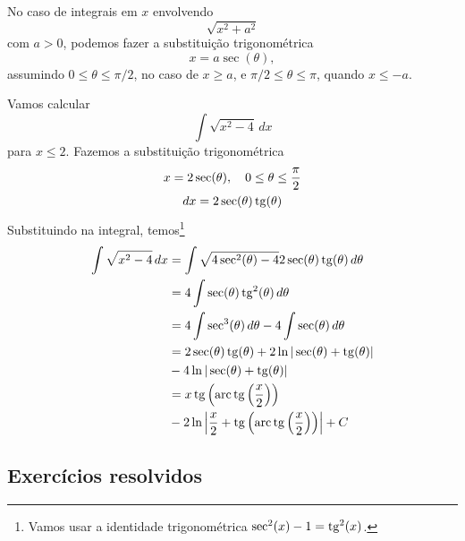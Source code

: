 No caso de integrais em $x$ envolvendo
\begin{equation}
  \sqrt{x^2+a^2}
\end{equation}
com $a>0$, podemos fazer a substituição trigonométrica
\begin{equation}
  x = a\sec(\theta),
\end{equation}
assumindo $0\leq\theta\leq\pi/2$, no caso de $x\geq a$, e $\pi/2\leq\theta\leq\pi$, quando $x\leq -a$.

\begin{ex}
  Vamos calcular
  \begin{equation}
    \int\sqrt{x^2-4}\,dx
  \end{equation}
  para $x\leq 2$. Fazemos a substituição trigonométrica
  \begin{gather}
    x = 2\sec(\theta),\quad 0\leq\theta\leq\frac{\pi}{2}\\
    dx = 2\sec(\theta)\operatorname{tg}(\theta)
  \end{gather}
  Substituindo na integral, temos\footnote{Vamos usar a identidade trigonométrica $\sec^2(x)-1=\operatorname{tg}^2(x)$.}
  \begin{align}
    \int\sqrt{x^2-4}\,dx &= \int\sqrt{4\sec^2(\theta)-4}2\sec(\theta)\operatorname{tg}(\theta)\,d\theta\\
                         &= 4\int\sec(\theta)\operatorname{tg}^2(\theta)\,d\theta\\
                         &= 4\int\sec^3(\theta)\,d\theta - 4\int\sec(\theta)\,d\theta\\
                         &= 2\sec(\theta)\operatorname{tg}(\theta) + 2\ln|\sec(\theta)+\operatorname{tg}(\theta)| \\
                         &- 4\ln|\sec(\theta)+\operatorname{tg}(\theta)|\\
                         &= x\operatorname{tg}\left(\operatorname{arc}\operatorname{tg}\left(\frac{x}{2}\right)\right) \\
                         &- 2\ln\left|\frac{x}{2}+\operatorname{tg}\left(\operatorname{arc}\operatorname{tg}\left(\frac{x}{2}\right)\right)\right| + C
  \end{align}
\end{ex}

\subsection*{Exercícios resolvidos}

